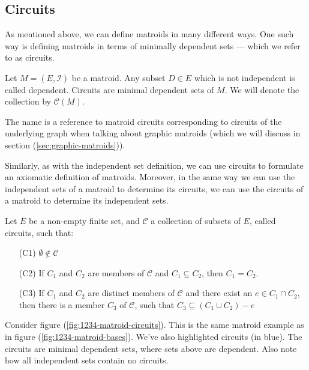 \subsection{Circuits}\label{sec:circuits}
As mentioned above, we can define matroids in many different ways. One such way is defining matroids in terms of minimally dependent sets --- which we refer to as circuits.

\begin{defn}
Let $M = (E, \mathcal{I})$ be a matroid. Any subset $D \in E$ which is not independent is called dependent. Circuits are minimal dependent sets of $M$. We will denote the collection by $\mathcal{C}(M)$.
\end{defn}

The name is a reference to matroid circuits corresponding to circuits of the underlying graph when talking about graphic matroids (which we will discuss in section (\ref{sec:graphic-matroids})).

Similarly, as with the independent set definition, we can use circuits to formulate an axiomatic definition of matroids. Moreover, in the same way we can use the independent sets of a matroid to determine its circuits, we can use the circuits of a matroid to determine its independent sets.

\begin{defn}
    Let $E$ be a non-empty finite set, and $\mathcal{C}$ a collection of subsets of $E$, called circuits, such that:

    \begin{enumerate}
      \item[(C1)] $\emptyset \notin \mathcal{C}$

        \item[(C2)] If $C_1$ and $C_2$ are members of $\mathcal{C}$ and $C_1 \subseteq C_2$, then $C_1 = C_2$.

        \item[(C3)] If $C_1$ and $C_2$ are distinct members of $\mathcal{C}$ and there exist an $e \in C_1 \cap C_2$, then there is a member $C_3$ of $\mathcal{C}$, such that $C_3 \subseteq (C_1  \cup C_2) - e$
    \end{enumerate}
    
\end{defn}

\begin{exmp}
  Consider figure (\ref{fig:1234-matroid-circuits}). This is the same matroid example as in figure (\ref{fig:1234-matroid-bases}). We've also highlighted circuits (in blue). The circuits are minimal dependent sets, where sets above are dependent. Also note how all independent sets contain no circuits.
\end{exmp}

